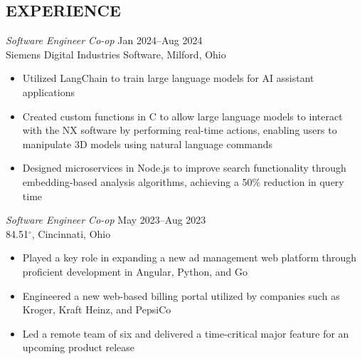 \documentclass[margin]{res} %
\begin{document}
\begin{resume}
\vspace*{-4.5mm}
 
 
\section{EXPERIENCE}
{\sl Software Engineer Co-op} \hfill {\color{black} Jan 2024–Aug 2024} \\
Siemens Digital Industries Software, Milford, Ohio
\vspace{1mm}
\begin{itemize}  %
\item Utilized LangChain to train large language models for AI assistant applications 
\item Created custom functions in C to allow large language models to interact with the NX software by performing real-time actions, enabling users to manipulate 3D models using natural language commands 
\item Designed microservices in Node.js to improve search functionality through\\embedding-based analysis algorithms, achieving a 50\% reduction in query time 
\end{itemize}


{\sl Software Engineer Co-op} \hfill {\color{black} May 2023–Aug 2023}  \\
84.51$^{\circ}$, Cincinnati, Ohio 
\vspace{1mm}
\begin{itemize}  %
\item Played a key role in expanding a new ad management web platform through proficient development in Angular, Python, and Go
\item Engineered a new web-based billing portal utilized by companies such as Kroger, Kraft Heinz, and PepsiCo
\item Led a remote team of six and delivered a time-critical major feature for an upcoming product release
\end{itemize}



\end{resume}
\end{document}
